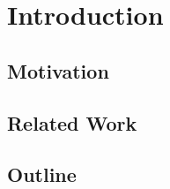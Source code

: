 \chapter{Introduction}
\label{ch:introduction}

\section{Motivation}
\label{sec:motivation}

\section{Related Work}
\label{sec:relatedwork}

\section{Outline}
\label{sec:overview}
